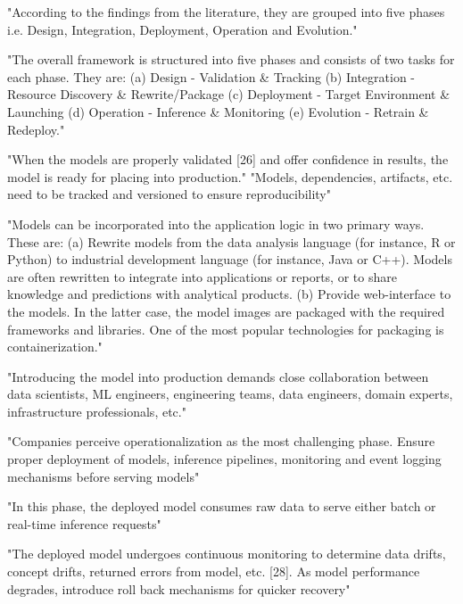 
\parencite{John2021ArchitectingLiterature}

"According to the findings from the literature, they are grouped into five phases
i.e. Design, Integration, Deployment, Operation and Evolution."

"The overall framework is structured into five phases and consists
of two tasks for each phase. They are:
(a) Design - Validation \& Tracking
(b) Integration - Resource Discovery \& Rewrite/Package
(c) Deployment - Target Environment \& Launching
(d) Operation - Inference \& Monitoring
(e) Evolution - Retrain \& Redeploy."

"When the models are properly validated [26] and offer confidence in results,
the model is ready for placing into production."
"Models, dependencies, artifacts, etc. need to be tracked and versioned to
ensure reproducibility"

"Models can be incorporated into the application logic in two primary ways.
These are:
(a) Rewrite models from the data analysis language (for instance, R or Python)
to industrial development language (for instance, Java or C++). Models are often
rewritten to integrate into applications or reports, or to share knowledge and
predictions with analytical products.
(b) Provide web-interface to the models. In the latter case, the model images
are packaged with the required frameworks and libraries. One of the most popular
technologies for packaging is containerization."

"Introducing the model into production demands close collaboration between data
scientists, ML engineers, engineering teams, data engineers, domain experts,
infrastructure professionals, etc."

"Companies perceive operationalization as the most challenging phase. Ensure
proper deployment of models, inference pipelines, monitoring and event logging
mechanisms before serving models"

"In this phase, the deployed model consumes raw data to serve either batch or
real-time inference requests"

"The deployed model undergoes continuous monitoring to determine data drifts,
concept drifts, returned errors from model, etc. [28]. As model performance
degrades, introduce roll back mechanisms for quicker recovery"

